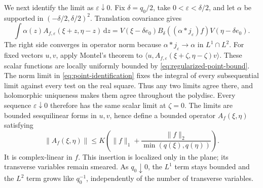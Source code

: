 \documentclass[11pt, letterpaper, reqno]{amsart}
\theoremstyle{definition}
\theoremstyle{remark}
\newcommand{\dd}{\,\mathrm{d}}
\begin{document}
We next identify the limit as $\varepsilon\downarrow0$. Fix
$\delta=q_0/2$, take $0<\varepsilon<\delta/2$, and let $\alpha$ be
supported in $(-\delta/2,\delta/2)^2$. Translation covariance gives
\begin{equation}\label{eq:point-identification}
 \int\alpha(z)A_{f,\varepsilon}(\xi+z,\eta-z)\dd z
 =V(\xi-\delta e_0)B_\delta((\alpha*j_\varepsilon)f)
           V(\eta-\delta e_0).
\end{equation}
The right side converges in operator norm because
$\alpha*j_\varepsilon\to\alpha$ in $L^1\cap L^2$.
For fixed vectors $u,v$, apply Montel's theorem to
$\langle u,A_{f,\varepsilon}(\xi+\zeta,\eta-\zeta)v\rangle$.
These scalar functions are locally uniformly bounded by
\eqref{eq:regularized-point-bound}. The norm limit in
\eqref{eq:point-identification} fixes the integral of every
subsequential limit against every test on the real square. Thus any
two limits agree there, and holomorphic uniqueness makes them agree
throughout the polydisc. Every sequence $\varepsilon\downarrow0$
therefore has the same scalar limit at $\zeta=0$. The limits are
bounded sesquilinear forms in $u,v$, hence define a bounded operator
$A_f(\xi,\eta)$ satisfying
\begin{equation}\label{eq:point-bound}
 \|A_f(\xi,\eta)\|\leq
 K\left(\|f\|_1+\frac{\|f\|_2}{\min(q(\xi),q(\eta))}\right).
\end{equation}
It is complex-linear in $f$. This insertion is localized only in the
plane; its transverse variables remain smeared. As $q_0\downarrow0$,
the $L^1$ term stays bounded and the $L^2$ term grows like $q_0^{-1}$,
independently of the number of transverse variables.
\end{document}
